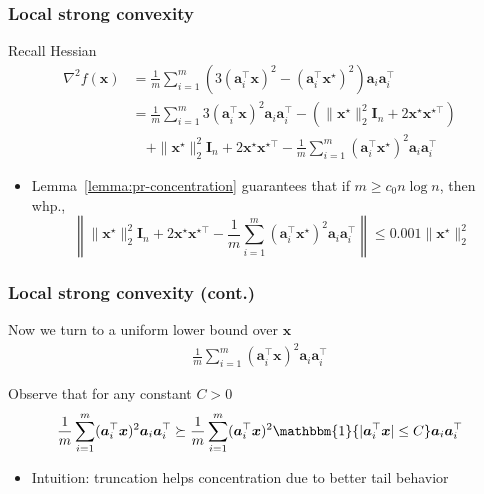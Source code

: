 \documentclass[compress,
mathserif,wide,%
]{beamer}
\newcommand{\indicator}{\ensuremath{\mathbbm{1}}}
\begin{document}
\begin{frame}
	\frametitle{Local strong convexity}
	Recall Hessian
	\begin{align*}
		\nabla^2 f (\bm{x}) &= \frac{1}{m} \sum_{i=1}^{m} ( 3 (\bm{a}_i^\top \bm{x} )^2 - (\bm{a}_i^\top \bm{x}^\star )^2 ) \bm{a}_i \bm{a}_i^\top \\
		&= \frac{1}{m} \sum_{i=1}^{m} 3 (\bm{a}_i^\top \bm{x} )^2 \bm{a}_i \bm{a}_i^\top - ( \| \bm{x}^\star \|_{2}^2 \bm{I}_{n} + 2 \bm{x}^\star \bm{x}^{\star \top} )  \\
		&\quad + \| \bm{x}^\star \|_{2}^2 \bm{I}_{n} + 2 \bm{x}^\star \bm{x}^{\star \top} - \frac{1}{m} \sum_{i=1}^{m} (\bm{a}_i^\top \bm{x}^\star )^2 \bm{a}_i \bm{a}_i^\top
	\end{align*}
	
	\begin{itemize}
		\item Lemma~\ref{lemma:pr-concentration} guarantees that if $m \geq c_0 n \log n$, then whp.,
			\[
				\left \| \| \bm{x}^\star \|_{2}^2 \bm{I}_{n} + 2 \bm{x}^\star \bm{x}^{\star \top} - \frac{1}{m} \sum_{i=1}^{m} (\bm{a}_i^\top \bm{x}^\star )^2 \bm{a}_i \bm{a}_i^\top \right \| \leq 0.001 \| \bm{x}^\star \|_{2}^2
			\]
	\end{itemize}
\end{frame}


\begin{frame}
	\frametitle{Local strong convexity (cont.)}
	Now we turn to a uniform lower bound over $\bm{x}$
	\begin{align*}
		\frac{1}{m} \sum_{i=1}^{m} (\bm{a}_i^\top \bm{x} )^2 \bm{a}_i \bm{a}_i^\top
	\end{align*}
	
	Observe that for any constant $C > 0$
	\begin{align*}
		\frac{1}{m} \sum_{i=1}^{m} (\bm{a}_i^\top \bm{x} )^2 \bm{a}_i \bm{a}_i^\top \succeq \frac{1}{m} \sum_{i=1}^{m} (\bm{a}_i^\top \bm{x} )^2 \indicator\{ | \bm{a}_i^\top \bm{x} | \leq C \} \bm{a}_i \bm{a}_i^\top
	\end{align*}
	
	\begin{itemize}
		\item Intuition: truncation helps concentration due to better tail behavior
	\end{itemize}
\end{frame}
\end{document}
